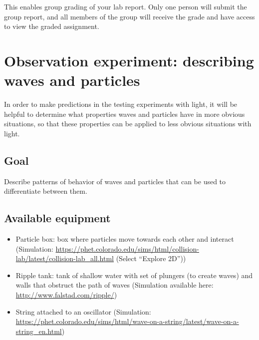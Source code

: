 This enables group grading of your lab report. Only one person will submit the group report, and all members of the group will receive the grade and have access to view the graded assignment.

\section{Observation experiment: describing waves and particles}

In order to make predictions in the testing experiments with light, it will be helpful to determine what properties waves and particles have in more obvious situations, so that these properties can be applied to less obvious situations with light.

\subsection{Goal}

Describe patterns of behavior of waves and particles that can be used to differentiate between them.




\subsection{Available equipment}

\begin{itemize}
	\item Particle box: box where particles move towards each other and interact (Simulation:  \url{https://phet.colorado.edu/sims/html/collision-lab/latest/collision-lab_all.html} (Select ``Explore 2D''))

	\item Ripple tank: tank of shallow water with set of plungers (to create waves) and walls that obstruct the path of waves (Simulation available here: \url{http://www.falstad.com/ripple/})
	
	\item String attached to an oscillator (Simulation: \url{https://phet.colorado.edu/sims/html/wave-on-a-string/latest/wave-on-a-string_en.html})
\end{itemize}

